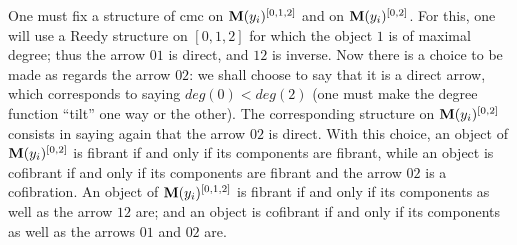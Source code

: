 One must fix a structure
of cmc on ${\bf M} (y_i)^{[0,1,2]}$ and on ${\bf M} (y_i)^{[0,2]}$. For this, one
will use a
Reedy structure on $[0,1,2]$ for which the object $1$ is of maximal
degree; thus the arrow $01$ is direct, and $12$ is inverse. Now there
is a choice to be made as regards the arrow $02$: we shall choose to say
that it is a direct arrow, which corresponds to saying $deg (0)<deg(2)$
(one must make the degree function ``tilt'' one way or the other).
The corresponding structure on ${\bf M} (y_i)^{[0,2]}$ consists in saying
again that the
arrow $02$ is direct. With this choice, an object of ${\bf M} (y_i)^{[0,2]}$ is
fibrant if and only if its components are fibrant, while an object is
cofibrant if and only if its components are fibrant %
and the arrow $02$
is a cofibration. An object of ${\bf M} (y_i)^{[0,1,2]}$ is fibrant if and
only if
its components as well as the arrow $12$ are; and an object is cofibrant if
and only if its components as well as the arrows $01$ and $02$ are.

